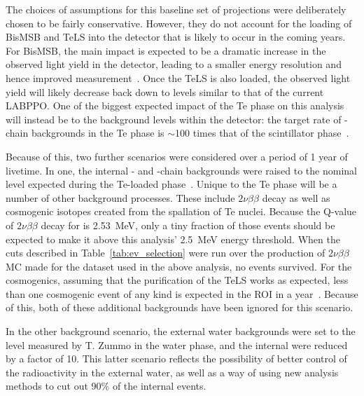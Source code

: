 The choices of assumptions for this baseline set of projections were deliberately chosen to be fairly conservative. However, they do not account for the loading of BisMSB and TeLS into the detector that is likely to occur in the coming years. For BisMSB, the main impact is expected to be a dramatic increase in the observed light yield in the detector, leading to a smaller energy resolution and hence improved measurement~\cite{albaneseSNOExperiment2021}. %
Once the TeLS is also loaded, the observed light yield will likely decrease back down to levels similar to that of the current LABPPO. One of the biggest expected impact of the Te phase on this analysis will instead be to the background levels within the detector: the target rate of -chain backgrounds in the Te phase is $\sim$100 times that of the scintillator phase~\cite{andringaCurrentStatusFuture2016}. %

Because of this, two further scenarios were considered over a period of 1 year of livetime. In one, the internal - and -chain backgrounds were raised to the nominal level expected during the Te-loaded phase~\cite{kroupovaImprovingSensitivityNeutrinoless2020}. %
Unique to the Te phase will be a number of other background processes. These include $2\nu\beta\beta$ decay as well as cosmogenic isotopes created from the spallation of Te nuclei. Because the Q-value of $2\nu\beta\beta$ decay for  is \SI{2.53}{\MeV}, only a tiny fraction of those events should be expected to make it above this analysis' \SI{2.5}{\MeV} energy threshold. When the cuts described in Table~\ref{tab:ev_selection} were run over the production of $2\nu\beta\beta$ MC made for the dataset used in the above analysis, no events survived. For the cosmogenics, assuming that the purification of the TeLS works as expected, less than one cosmogenic event of any kind is expected in the \onbb{} ROI in a year~\cite{kroupovaImprovingSensitivityNeutrinoless2020}. %
Because of this, both of these additional backgrounds have been ignored for this scenario.

In the other background scenario, the external water backgrounds were set to the level measured by T. Zummo in the water phase, and the internal  were reduced by a factor of 10. This latter scenario reflects the possibility of better control of the radioactivity in the external water, as well as a way of using new analysis methods to cut out 90\% of the internal  events.


